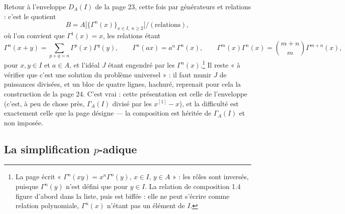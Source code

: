 \documentclass[11pt,a4paper]{article}
\begin{document}
Retour à l'enveloppe $D_A(I)$ de la page 23, cette fois par générateurs et
relations : c'est le quotient
\[
B = A\bigl[\{\Gamma^{n}(x)\}_{x \in I,\ n \geqslant 2}\bigr] \big/ (\text{relations}),
\]
où l'on convient que $\Gamma^{1}(x) = x$, les relations étant
\[
\Gamma^{n}(x+y) = \sum_{p+q=n}\Gamma^{p}(x)\Gamma^{q}(y), \qquad
\Gamma^{n}(ax) = a^{n}\,\Gamma^{n}(x), \qquad
\Gamma^{m}(x)\Gamma^{n}(x) = \binom{m+n}{m}\Gamma^{m+n}(x),
\]
pour $x, y \in I$ et $a \in A$, et l'idéal $J$ étant engendré par les
$\Gamma^{n}(x)$.\footnote{La page écrit « $\Gamma^{n}(xy) =
x^{n}\Gamma^{n}(y)$, $x \in I$, $y \in A$ » : les rôles sont inversés, puisque
$\Gamma^{n}(y)$ n'est défini que pour $y \in I$. La relation de composition
1.4 figure d'abord dans la liste, puis est biffée : elle ne peut s'écrire
comme relation polynomiale, $\Gamma^{n}(x)$ n'étant pas un élément de $I$.}
Il reste « à vérifier que c'est une solution du problème universel » : il
faut munir $J$ de puissances divisées, et un bloc de quatre lignes, hachuré,
reprenait pour cela la construction de la page 24. C'est vrai : cette
présentation est celle de l'enveloppe (c'est, à peu de chose près,
$\Gamma_A(I)$ divisé par les $x^{[1]} - x$), et la difficulté est
exactement celle que la page désigne — la composition est héritée de
$\Gamma_A(I)$ et non imposée.

\subsection*{La simplification $p$-adique}
\end{document}
